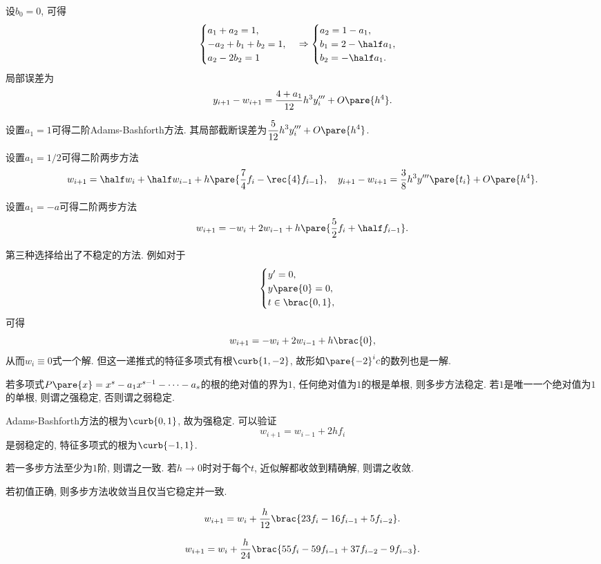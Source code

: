 \documentclass{ctexart}
\begin{document}
设$b_0 = 0$, 可得
\[ \begin{cases}
    a_1 + a_2 = 1,\\
    -a_2 + b_1 + b_2 = 1, \\
    a_2 - 2b_2 = 1
\end{cases} \Rightarrow \begin{cases}
    a_2 = 1-a_1, \\
    \displaystyle b_1 = 2-\half a_1, \\
    \displaystyle b_2 = -\half a_1.
\end{cases} \]
局部误差为
\[ y_{i+1} - w_{i+1} = \frac{4+a_1}{12}h^3 y'''_i + O\pare{h^4}. \]
\begin{cenum}
    \item 设置$a_1 = 1$可得二阶Adams-Bashforth方法. 其局部截断误差为$\displaystyle \frac{5}{12}h^3 y'''_i + O\pare{h^4}$.
    \item 设置$a_1 = 1/2$可得二阶两步方法
    \[ w_{i+1} = \half w_i + \half w_{i-1} + h\pare{\frac{7}{4}f_i - \rec{4}f_{i-1}},\quad y_{i+1} - w_{i+1} = \frac{3}{8}h^3 y'''\pare{t_i} + O\pare{h^4}. \]
    \item 设置$a_1 = -a$可得二阶两步方法
    \[ w_{i+1} = -w_i + 2w_{i-1} + h\pare{\frac{5}{2}f_i + \half f_{i-1}}. \]
\end{cenum}
第三种选择给出了不稳定的方法. 例如对于
\[ \begin{cases}
    y' = 0,\\
    y\pare{0} = 0, \\
    t\in\brac{0,1},
\end{cases} \]
可得
\[ w_{i+1} = -w_i + 2w_{i-1} + h\brac{0}, \]
从而$w_i \equiv 0$式一个解. 但这一递推式的特征多项式有根$\curb{1,-2}$, 故形如$\pare{-2}^i c$的数列也是一解.


\begin{definition}
    若多项式$P\pare{x} = x^s - a_1 x^{s-1} - \cdots - a_s$的根的绝对值的界为$1$, 任何绝对值为$1$的根是单根, 则多步方法稳定. 若$1$是唯一一个绝对值为$1$的单根, 则谓之强稳定, 否则谓之弱稳定.
\end{definition}
Adams-Bashforth方法的根为$\curb{0,1}$, 故为强稳定. 可以验证
\[ w_{i+1} = w_{i-1} + 2hf_i \]
是弱稳定的, 特征多项式的根为$\curb{-1,1}$.

\begin{definition}
    若一多步方法至少为$1$阶, 则谓之一致. 若$h\rightarrow 0$时对于每个$t$, 近似解都收敛到精确解, 则谓之收敛.
\end{definition}
\begin{theorem}[Dahlquist]
    若初值正确, 则多步方法收敛当且仅当它稳定并一致.
\end{theorem}
\begin{theorem}
    \[ w_{i+1} = w_i + \frac{h}{12}\brac{23 f_i - 16f_{i-1} + 5f_{i-2}}. \]
\end{theorem}
\begin{theorem}
    \[ w_{i+1} = w_i + \frac{h}{24}\brac{55f_i - 59f_{i-1} + 37f_{i-2} - 9f_{i-3}}. \]
\end{theorem}
\end{document}
